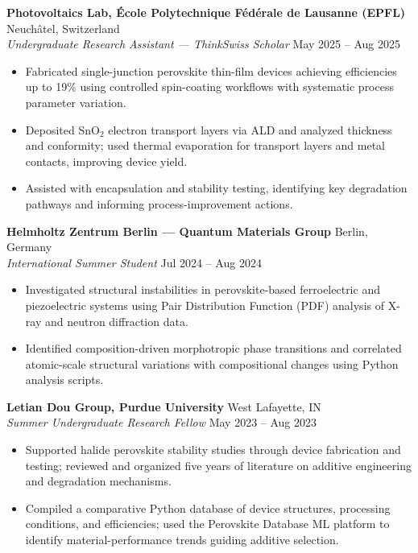 \documentclass[10pt, letterpaper]{article}
\newcommand{\role}[2]{%
  \textit{#1} \hfill #2 \\[-2pt]%
}
\begin{document}
\textbf{Photovoltaics Lab, \'Ecole Polytechnique F\'ed\'erale de Lausanne (EPFL)} \hfill Neuch\^atel, Switzerland \\
\role{Undergraduate Research Assistant --- ThinkSwiss Scholar}{May 2025 -- Aug 2025}
\begin{itemize}
  \item Fabricated single-junction perovskite thin-film devices achieving efficiencies up to 19\%
    using controlled spin-coating workflows with systematic process parameter variation.
  \item Deposited SnO$_2$ electron transport layers via ALD and analyzed thickness and conformity;
    used thermal evaporation for transport layers and metal contacts, improving device yield.
  \item Assisted with encapsulation and stability testing, identifying key degradation pathways
    and informing process-improvement actions.
\end{itemize}

\vspace{6pt}

\textbf{Helmholtz Zentrum Berlin --- Quantum Materials Group} \hfill Berlin, Germany \\
\role{International Summer Student}{Jul 2024 -- Aug 2024}
\begin{itemize}
  \item Investigated structural instabilities in perovskite-based ferroelectric and piezoelectric
    systems using Pair Distribution Function (PDF) analysis of X-ray and neutron diffraction data.
  \item Identified composition-driven morphotropic phase transitions and correlated atomic-scale
    structural variations with compositional changes using Python analysis scripts.
\end{itemize}

\vspace{6pt}

\textbf{Letian Dou Group, Purdue University} \hfill West Lafayette, IN \\
\role{Summer Undergraduate Research Fellow}{May 2023 -- Aug 2023}
\begin{itemize}
  \item Supported halide perovskite stability studies through device fabrication and testing;
    reviewed and organized five years of literature on additive engineering and degradation
    mechanisms.
  \item Compiled a comparative Python database of device structures, processing conditions, and
    efficiencies; used the Perovskite Database ML platform to identify material-performance trends
    guiding additive selection.
\end{itemize}
\end{document}
